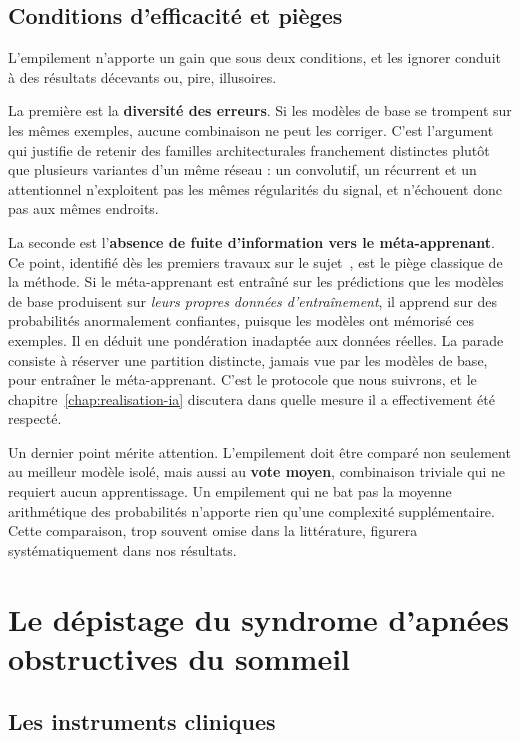 \subsection{Conditions d'efficacité et pièges}

L'empilement n'apporte un gain que sous deux conditions, et les ignorer conduit à des
résultats décevants ou, pire, illusoires.

La première est la \textbf{diversité des erreurs}. Si les modèles de base se trompent
sur les mêmes exemples, aucune combinaison ne peut les corriger. C'est l'argument qui
justifie de retenir des familles architecturales franchement distinctes plutôt que
plusieurs variantes d'un même réseau : un convolutif, un récurrent et un attentionnel
n'exploitent pas les mêmes régularités du signal, et n'échouent donc pas aux mêmes
endroits.

La seconde est l'\textbf{absence de fuite d'information vers le méta-apprenant}. Ce
point, identifié dès les premiers travaux sur le sujet~\cite{ting1999}, est le piège
classique de la méthode. Si le méta-apprenant est entraîné sur les prédictions que les
modèles de base produisent sur \emph{leurs propres données d'entraînement}, il apprend
sur des probabilités anormalement confiantes, puisque les modèles ont mémorisé ces
exemples. Il en déduit une pondération inadaptée aux données réelles. La parade
consiste à réserver une partition distincte, jamais vue par les modèles de base, pour
entraîner le méta-apprenant. C'est le protocole que nous suivrons, et le
chapitre~\ref{chap:realisation-ia} discutera dans quelle mesure il a effectivement été
respecté.

Un dernier point mérite attention. L'empilement doit être comparé non seulement au
meilleur modèle isolé, mais aussi au \textbf{vote moyen}, combinaison triviale qui ne
requiert aucun apprentissage. Un empilement qui ne bat pas la moyenne arithmétique des
probabilités n'apporte rien qu'une complexité supplémentaire. Cette comparaison, trop
souvent omise dans la littérature, figurera systématiquement dans nos résultats.

\section{Le dépistage du syndrome d'apnées obstructives du sommeil}

\subsection{Les instruments cliniques}

